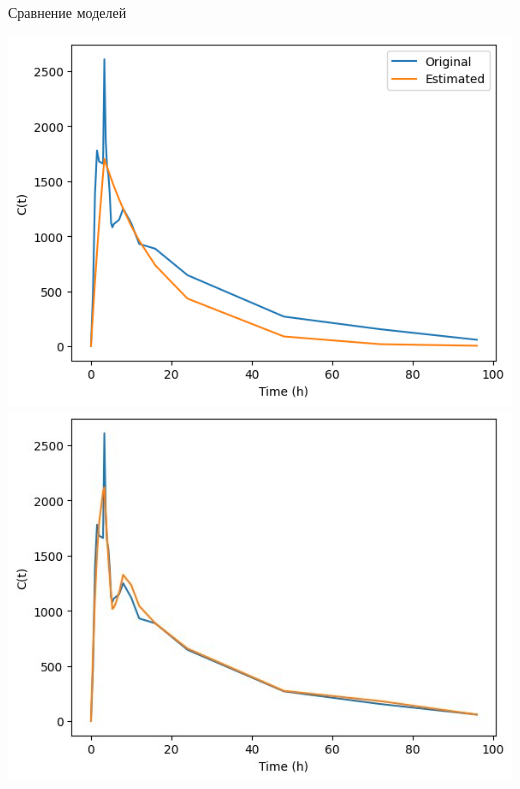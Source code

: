 \documentclass[12pt]{beamer}
\begin{document}
\begin{frame}{Сравнение моделей}
\begin{minipage}{0.45\linewidth}
		\includegraphics[width=\linewidth]{results/basic_2.png}
		\includegraphics[width=\linewidth]{results/2.jpg}
	\end{minipage}
\end{frame}
\end{document}

